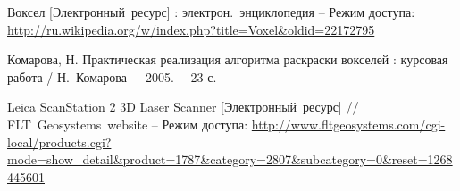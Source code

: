 \renewcommand{\refname}{Список литературы}
\begin{thebibliography}{99}

		Воксел [Электронный~ресурс] : электрон.~энциклопедия -- Режим доступа: \url{http://ru.wikipedia.org/w/index.php?title=Voxel&oldid=22172795}

			Комарова, Н. Практическая реализация алгоритма раскраски вокселей : курсовая работа / 
			Н.~Комарова~--~2005.~-~23 с.
	
	
		Leica ScanStation 2 3D Laser Scanner [Электронный~ресурс] // FLT~Geosystems~website -- Режим доступа:
		\url{http://www.fltgeosystems.com/cgi-local/products.cgi?mode=show_detail&product=1787&category=2807&subcategory=0&reset=1268445601}

\end{thebibliography}

